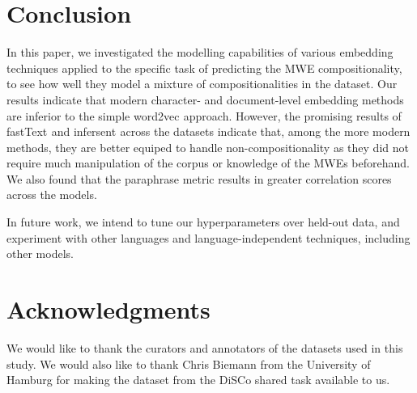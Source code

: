 \documentclass[11pt,a4paper]{article}
\newcommand{\embmethod}[2][]{\textsf{#2}$_{\text{#1}}$\xspace}
\newcommand{\wordtovec}{\embmethod{word2vec}}
\newcommand{\infersent}[1][]{\embmethod[#1]{infersent}}
\newcommand{\fasttext}{\embmethod{fastText}}
\begin{document}
\section{Conclusion}
\label{sec:length}

In this paper, we investigated the modelling capabilities of various embedding techniques applied to the specific task of predicting the MWE compositionality, to see how well they model a mixture of compositionalities in the dataset. Our results indicate that modern character- and document-level embedding methods are inferior to the simple \wordtovec approach. However, the promising results of \fasttext and \infersent across the datasets indicate that, among the more modern methods, they are better equiped to handle non-compositionality as they did not require much manipulation of the corpus or knowledge of the MWEs beforehand. We also found that the paraphrase metric results in greater correlation scores across the models.

In future work, we intend to tune our hyperparameters over held-out data, and experiment with other languages and language-independent techniques, including other models.

\section*{Acknowledgments}
We would like to thank the curators and annotators of the datasets used in this study.
We would also like to thank Chris Biemann from the University of Hamburg for making the dataset from the DiSCo shared task available to us.






\end{document}
